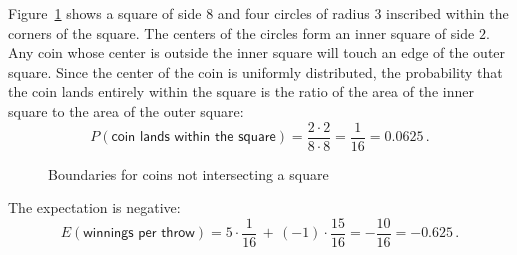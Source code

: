  Figure~\ref{f.coins1} shows a square of side $8$ and four circles of radius $3$ inscribed within the corners of the square. The centers of the circles form an inner square of side $2$. Any coin whose center is outside the inner square will touch an edge of the outer square. Since the center of the coin is uniformly distributed, the probability that the coin lands entirely within the square is the ratio of the area of the inner square to the area of the outer square:
\[
P(\textsf{coin lands within the square})=\frac{2\cdot 2}{8\cdot 8} =\frac{1}{16}=0.0625\,.
\]
\begin{figure}[tb]
\begin{center}
\end{center}
\caption{Boundaries for coins not intersecting a square}\label{f.coins1}
\end{figure}

 The expectation is negative:
\[
E(\textsf{winnings per throw})=5\cdot\frac{1}{16}\,+\,(-1)\cdot\frac{15}{16}=-\frac{10}{16}=-0.625\,.
\]


